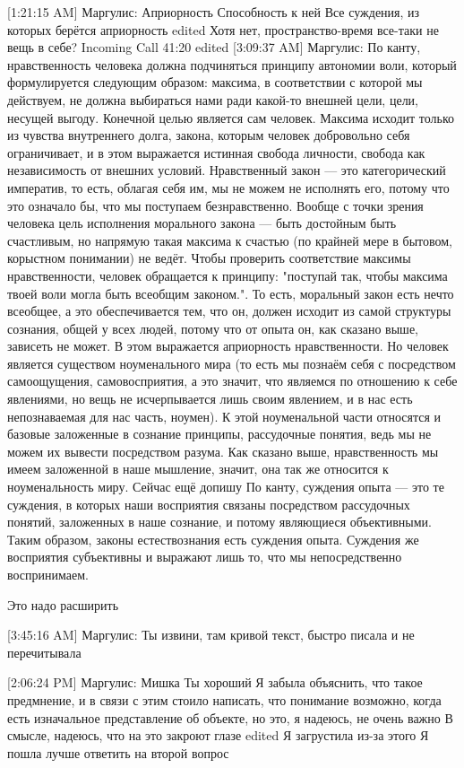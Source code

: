 \documentclass{article}
\begin{document}
[1:21:15 AM] Маргулис:
Априорность
 Способность к ней
 Все суждения, из которых берётся априорность
edited 
Хотя нет, пространство-время все-таки не вещь в себе?
Incoming Call 41:20
edited 
[3:09:37 AM] Маргулис:
По канту, нравственность человека должна подчиняться принципу автономии воли, который формулируется следующим образом: максима, в соответствии с которой мы действуем, не должна выбираться нами ради какой-то внешней цели, цели, несущей выгоду. Конечной целью является сам человек. Максима исходит только из чувства внутреннего долга, закона, которым человек добровольно себя ограничивает, и в этом выражается истинная свобода личности, свобода как независимость от внешних условий. Нравственный закон — это категорический императив, то есть, облагая себя им, мы не можем не исполнять его, потому что это означало бы, что мы поступаем безнравственно. Вообще с точки зрения человека цель исполнения морального закона — быть достойным быть счастливым, но напрямую такая максима к счастью (по крайней мере в бытовом, корыстном понимании) не ведёт. Чтобы проверить соответствие максимы нравственности, человек обращается к принципу: "поступай так, чтобы максима твоей воли могла быть всеобщим законом.". То есть, моральный закон есть нечто всеобщее, а это обеспечивается тем, что он, должен исходит из самой структуры сознания, общей у всех людей, потому что от опыта он, как сказано выше, зависеть не может. В этом выражается априорность нравственности. Но человек является существом ноуменального мира (то есть мы познаём себя с посредством самоощущения, самовосприятия, а это значит, что являемся по отношению к себе явлениями, но вещь не исчерпывается лишь своим явлением,  и в нас есть непознаваемая для нас часть, ноумен). К этой ноуменальной части относятся и базовые заложенные в сознание принципы, рассудочные понятия, ведь мы не можем их вывести посредством разума. Как сказано выше, нравственность мы имеем заложенной в наше мышление, значит, она так же относится к ноуменальность миру.
 Сейчас ещё допишу
 По канту, суждения опыта — это те суждения, в которых наши восприятия связаны посредством рассудочных понятий, заложенных в наше сознание, и потому являющиеся объективными. Таким образом, законы естествознания есть суждения опыта. Суждения же восприятия субъективны и выражают лишь то, что мы непосредственно воспринимаем.

Это надо расширить

[3:45:16 AM] Маргулис:
Ты извини, там кривой текст, быстро писала и не перечитывала

[2:06:24 PM] Маргулис:
Мишка
 Ты хороший
 Я забыла объяснить, что такое предмнение, и в связи с этим стоило написать, что понимание возможно, когда есть изначальное представление об объекте, но это, я надеюсь, не очень важно
 В смысле, надеюсь, что на это закроют глазе
edited 
Я загрустила из-за этого
 Я пошла лучше ответить на второй вопрос
\end{document}
